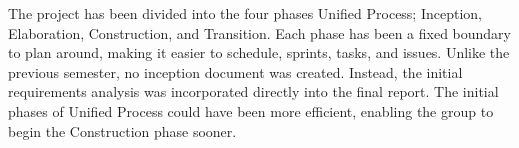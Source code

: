 The project has been divided into the four phases Unified Process; Inception,
Elaboration, Construction, and Transition. Each phase has been a fixed boundary
to plan around, making it easier to schedule, sprints, tasks, and issues.
Unlike the previous semester, no inception document was created. Instead, the
initial requirements analysis was incorporated directly into the final report.
The initial phases of Unified Process could have been more efficient, enabling
the group to begin the Construction phase sooner.
